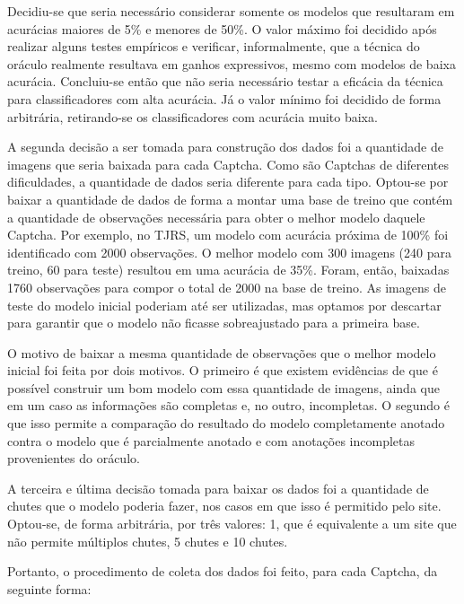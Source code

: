 \documentclass[12pt,twoside,brazilian]{book}
\begin{document}
Decidiu-se que seria necessário considerar somente os modelos que
resultaram em acurácias maiores de 5\% e menores de 50\%. O valor máximo
foi decidido após realizar alguns testes empíricos e verificar,
informalmente, que a técnica do oráculo realmente resultava em ganhos
expressivos, mesmo com modelos de baixa acurácia. Concluiu-se então que
não seria necessário testar a eficácia da técnica para classificadores
com alta acurácia. Já o valor mínimo foi decidido de forma arbitrária,
retirando-se os classificadores com acurácia muito baixa.

A segunda decisão a ser tomada para construção dos dados foi a
quantidade de imagens que seria baixada para cada Captcha. Como são
Captchas de diferentes dificuldades, a quantidade de dados seria
diferente para cada tipo. Optou-se por baixar a quantidade de dados de
forma a montar uma base de treino que contém a quantidade de observações
necessária para obter o melhor modelo daquele Captcha. Por exemplo, no
TJRS, um modelo com acurácia próxima de 100\% foi identificado com 2000
observações. O melhor modelo com 300 imagens (240 para treino, 60 para
teste) resultou em uma acurácia de 35\%. Foram, então, baixadas 1760
observações para compor o total de 2000 na base de treino. As imagens de
teste do modelo inicial poderiam até ser utilizadas, mas optamos por
descartar para garantir que o modelo não ficasse sobreajustado para a
primeira base.

O motivo de baixar a mesma quantidade de observações que o melhor modelo
inicial foi feita por dois motivos. O primeiro é que existem evidências
de que é possível construir um bom modelo com essa quantidade de
imagens, ainda que em um caso as informações são completas e, no outro,
incompletas. O segundo é que isso permite a comparação do resultado do
modelo completamente anotado contra o modelo que é parcialmente anotado
e com anotações incompletas provenientes do oráculo.

A terceira e última decisão tomada para baixar os dados foi a quantidade
de chutes que o modelo poderia fazer, nos casos em que isso é permitido
pelo site. Optou-se, de forma arbitrária, por três valores: 1, que é
equivalente a um site que não permite múltiplos chutes, 5 chutes e 10
chutes.

Portanto, o procedimento de coleta dos dados foi feito, para cada
Captcha, da seguinte forma:
\end{document}
